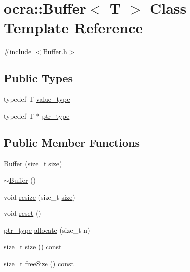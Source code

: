 \hypertarget{classocra_1_1Buffer}{}\section{ocra\+:\+:Buffer$<$ T $>$ Class Template Reference}
\label{classocra_1_1Buffer}


{\ttfamily \#include $<$Buffer.\+h$>$}

\subsection*{Public Types}
\begin{DoxyCompactItemize}
\item 
typedef T \hyperlink{classocra_1_1Buffer_ad03bef3764c265411b5b7726d94d8786}{value\+\_\+type}
\item 
typedef T $\ast$ \hyperlink{classocra_1_1Buffer_a26bf1dc373e2144eddd0dd8be4b37f84}{ptr\+\_\+type}
\end{DoxyCompactItemize}
\subsection*{Public Member Functions}
\begin{DoxyCompactItemize}
\item 
\hyperlink{classocra_1_1Buffer_a13b091b3f15fbdaadd00d87b89f0acd7}{Buffer} (size\+\_\+t \hyperlink{classocra_1_1Buffer_a1529f8d94050ee4bc99888508f70dcf7}{size})
\item 
\hyperlink{classocra_1_1Buffer_ac7050b30073f9fbfbf580c1b57a34781}{$\sim$\+Buffer} ()
\item 
void \hyperlink{classocra_1_1Buffer_a171d3ec7b50688fd529c8ae3dff7b6d1}{resize} (size\+\_\+t \hyperlink{classocra_1_1Buffer_a1529f8d94050ee4bc99888508f70dcf7}{size})
\item 
void \hyperlink{classocra_1_1Buffer_a3f6d6353bdb0e6eb2e577121be432f5f}{reset} ()
\item 
\hyperlink{classocra_1_1Buffer_a26bf1dc373e2144eddd0dd8be4b37f84}{ptr\+\_\+type} \hyperlink{classocra_1_1Buffer_a693db1946acad229a8e7ab84ac910301}{allocate} (size\+\_\+t n)
\item 
size\+\_\+t \hyperlink{classocra_1_1Buffer_a1529f8d94050ee4bc99888508f70dcf7}{size} () const 
\item 
size\+\_\+t \hyperlink{classocra_1_1Buffer_aa7f7836c9ba691d74fa1ce67ac38f611}{free\+Size} () const 
\end{DoxyCompactItemize}


